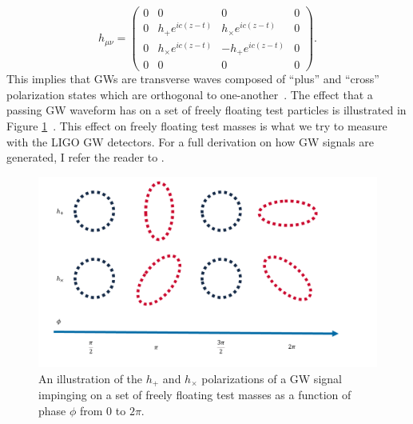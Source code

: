 \begin{equation}
  h_{\mu \nu} =   \begin{pmatrix}
0 & 0 & 0 & 0\\
0 & h_{+}e^{ic(z-t)} & h_{\times}e^{ic(z-t)} & 0\\
0 & h_{\times}e^{ic(z-t)} & -h_{+}e^{ic(z-t)} & 0\\
0 & 0 & 0 & 0
\end{pmatrix}.
\end{equation}
This implies that \ac{GW}s are transverse waves composed of ``plus'' and ``cross'' 
polarization states which are orthogonal to one-another~. The effect that a passing 
\ac{GW} waveform has on a set of freely floating test particles is 
illustrated in Figure \ref{fig:gw_plus_cross}~. This effect on freely floating test masses is what we try to measure with the \ac{LIGO} \ac{GW} detectors. 
For a full derivation on how \ac{GW} signals are generated, I refer 
the reader to \cite{Flanagan_2005}.

\begin{figure}
    \centering
    \includegraphics[width=\linewidth]{figures/GW_polarizations_thesis_figure.png}
    \caption[$h_+$ and $h_\times$ polarization illustration]{An illustration of the $h_+$ and $h_\times$ polarizations of a \ac{GW} signal impinging on a set of freely floating test masses as a function of phase $\phi$ from $0$ to $2\pi$.~}
    \label{fig:gw_plus_cross}
\end{figure}

